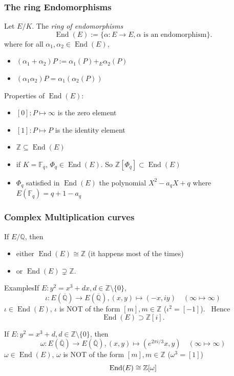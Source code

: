 \documentclass[10pt,final]{beamer} %
\newcommand{\Q}{\mathbb Q}
\newcommand{\Z}{\mathbb Z}
\newcommand{\F}{\mathbb F}
\theoremstyle{definition}
\begin{document}
\begin{frame}
\frametitle{The ring Endomorphisms}


\begin{Definition}\pause Let $E/K$. The \emph{ring of endomorphisms}
\alert{$$\operatorname{End}(E):=\{\alpha: E\rightarrow E, \alpha\text{ is an endomorphism}\}.$$}
where for all $\alpha_1,\alpha_2\in\operatorname{End}(E)$,\pause
\begin{itemize}[<+-|alert@+>]
  \item $(\alpha_1+\alpha_2)P:=\alpha_1(P)+_E\alpha_2(P)$
  \item $(\alpha_1\alpha_2)P=\alpha_1(\alpha_2(P))$
  \end{itemize}
\end{Definition}\pause

\begin{block}{Properties of $\operatorname{End}(E)$:}\pause
\begin{itemize}[<+-|alert@+>]
  \item \alert{$[0]:P\mapsto\infty$} is the zero element
  \item \alert{$[1]:P\mapsto P$} is the identity element
  \item $\Z\subseteq \operatorname{End}(E)$
  \item if $K=\F_q$, \alert{$\Phi_q\in\operatorname{End}(E)$}. So \alert{$\Z[\Phi_q]\subset\operatorname{End}(E)$}
  \item $\Phi_q$ satisfied in $\operatorname{End}(E)$ the polynomial $X^2-a_qX+q$
  where $E(\F_q)=q+1-a_q$
  \end{itemize}
\end{block}

\end{frame}

\begin{frame}
\frametitle{Complex Multiplication curves}

If $E/\Q$, then\pause
\begin{itemize}[<+-|alert@+>]
 \item either $\operatorname{End}(E)\cong\Z$ (it happens most of the times)
\item or $\operatorname{End}(E)\supsetneq\Z$.
\end{itemize}\pause


\begin{block}{Examples}\pause If \alert{$E: y^2=x^3+dx, d\in\Z\setminus\{0\}$}, \pause
$$\iota: E(\overline{\Q})\rightarrow E(\overline{\Q}), (x,y)\mapsto (-x,i y)\quad (\infty\mapsto\infty)$$\pause
$\iota\in\operatorname{End}(E)$, $\iota$ is NOT of the form $[m], m\in \Z$ ($\iota^2=[-1]$).\pause
\ Hence
$$\operatorname{End}(E)\supset\Z[i].$$\pause

If \alert{$E: y^2=x^3+d, d\in\Z\setminus\{0\}$}, then
$$\omega: E(\overline{\Q})\rightarrow E(\overline{\Q}), (x,y)\mapsto (e^{2\pi i/3}x,y)\quad (\infty\mapsto\infty)$$\pause
$\omega\in\operatorname{End}(E)$, $\omega$ is NOT of the form $[m], m\in \Z$ ($\omega^3=[1]$)\pause
$$\operatorname{End}(E)\cong\Z[\omega]\vspace*{-3.5pt}$$
\end{block}
\end{frame}
\end{document}
